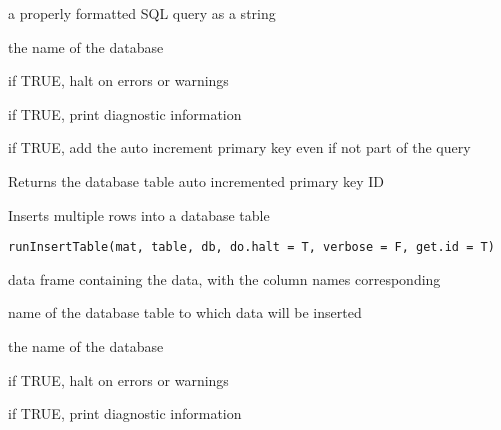 \documentclass[letterpaper]{book}
\begin{document}
%
\begin{Arguments}
\begin{ldescription}
\item[\code{query}] a properly formatted SQL query as a string

\item[\code{db}] the name of the database

\item[\code{do.halt}] if TRUE, halt on errors or warnings

\item[\code{verbose}] if TRUE, print diagnostic information

\item[\code{auto.increment}] if TRUE, add the auto increment primary key even if not part of the query
\end{ldescription}
\end{Arguments}
%
\begin{Value}
Returns the database table auto incremented primary key ID
\end{Value}
%
\begin{Description}\relax
Inserts multiple rows into a database table
\end{Description}
%
\begin{Usage}
\begin{verbatim}
runInsertTable(mat, table, db, do.halt = T, verbose = F, get.id = T)
\end{verbatim}
\end{Usage}
%
\begin{Arguments}
\begin{ldescription}
\item[\code{mat}] data frame containing the data, with the column names corresponding

\item[\code{table}] name of the database table to which data will be inserted

\item[\code{db}] the name of the database

\item[\code{do.halt}] if TRUE, halt on errors or warnings

\item[\code{verbose}] if TRUE, print diagnostic information
\end{ldescription}
\end{Arguments}
\end{document}
